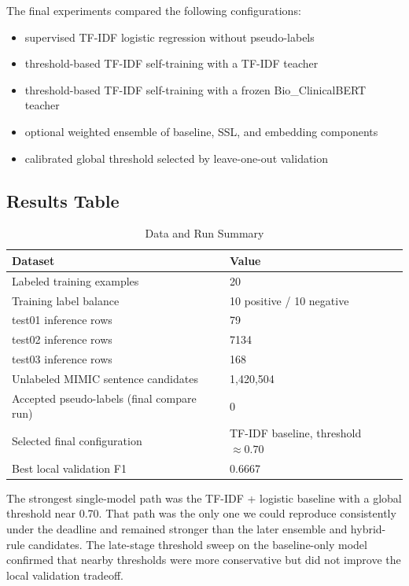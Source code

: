 \documentclass[journal]{IEEEtran}
\begin{document}
The final experiments compared the following configurations:
\begin{itemize}
    \item supervised TF-IDF logistic regression without pseudo-labels
    \item threshold-based TF-IDF self-training with a TF-IDF teacher
    \item threshold-based TF-IDF self-training with a frozen Bio\_ClinicalBERT teacher
    \item optional weighted ensemble of baseline, SSL, and embedding components
    \item calibrated global threshold selected by leave-one-out validation
\end{itemize}

\subsection{Results Table}

\begin{table}[h]
\caption{Data and Run Summary}
\centering
\begin{tabular}{|p{}|p{}|}
\hline
Dataset & Value \\
\hline
Labeled training examples & 20 \\
Training label balance & 10 positive / 10 negative \\
test01 inference rows & 79 \\
test02 inference rows & 7134 \\
test03 inference rows & 168 \\
Unlabeled MIMIC sentence candidates & 1,420,504 \\
Accepted pseudo-labels (final compare run) & 0 \\
Selected final configuration & TF-IDF baseline, threshold $\approx 0.70$ \\
Best local validation F1 & 0.6667 \\
\hline
\end{tabular}
\end{table}

The strongest single-model path was the TF-IDF + logistic baseline with a global threshold near 0.70. That path was the only one we could reproduce consistently under the deadline and remained stronger than the later ensemble and hybrid-rule candidates. The late-stage threshold sweep on the baseline-only model confirmed that nearby thresholds were more conservative but did not improve the local validation tradeoff.
\end{document}
